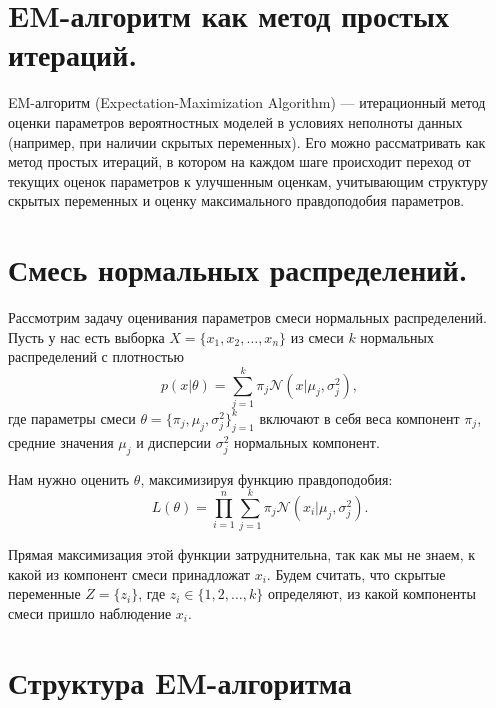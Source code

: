 \section*{\textbf{EM-алгоритм как метод простых итераций.}}

EM-алгоритм (Expectation-Maximization Algorithm) --- итерационный метод оценки параметров вероятностных моделей в условиях неполноты данных (например, при наличии скрытых переменных).
Его можно рассматривать как метод простых итераций, в котором на каждом шаге происходит переход от текущих оценок параметров к улучшенным оценкам, учитывающим структуру скрытых переменных и оценку максимального правдоподобия параметров.

\section*{\textbf{Смесь нормальных распределений.}}

\noindent Рассмотрим задачу оценивания параметров смеси нормальных распределений. Пусть у нас есть выборка $X = \{x_1, x_2, \dots, x_n\}$ из смеси $k$ нормальных распределений с плотностью
\[
    p(x|\theta) = \sum_{j=1}^k \pi_j \mathcal{N}(x|\mu_j, \sigma_j^2),
\]
где параметры смеси $\theta = \{\pi_j, \mu_j, \sigma_j^2 \}_{j=1}^k$ включают в себя веса компонент $\pi_j$, средние значения $\mu_j$ и дисперсии $\sigma_j^2$ нормальных компонент.

\noindent Нам нужно оценить $\theta$, максимизируя функцию правдоподобия:
\[
    L(\theta) = \prod_{i=1}^n \sum_{j=1}^k \pi_j \mathcal{N}(x_i|\mu_j, \sigma_j^2).
\]

Прямая максимизация этой функции затруднительна, так как мы не знаем, к какой из компонент смеси принадложат $x_i$. Будем считать, что скрытые переменные $Z = \{z_{i}\}$, где $z_i \in \{1,2,\dots,k\}$ определяют, из какой компоненты смеси пришло наблюдение $x_i$.

\section*{\textbf{Структура EM-алгоритма}}

